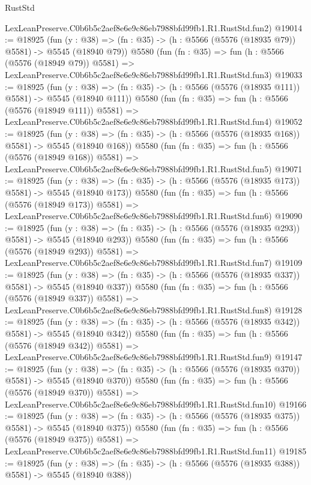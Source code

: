 \begin{lexlean}{RustStd}
\begin{coremodule}
    LexLeanPreserve.C0b6b5c2aef8e6e9c86eb7988bfd99fb1.R1.RustStd.fun2)
@19014 := @18925
    (fun (y : @38) => (fn : @35) -> (h : @5566 (@5576 (@18935 @79)) @5581) -> @5545 (@18940 @79))
    @5580
    (fun (fn : @35) =>
    fun (h : @5566 (@5576 (@18949 @79)) @5581) =>
    LexLeanPreserve.C0b6b5c2aef8e6e9c86eb7988bfd99fb1.R1.RustStd.fun3)
@19033 := @18925
    (fun (y : @38) => (fn : @35) -> (h : @5566 (@5576 (@18935 @111)) @5581) -> @5545 (@18940 @111))
    @5580
    (fun (fn : @35) =>
    fun (h : @5566 (@5576 (@18949 @111)) @5581) =>
    LexLeanPreserve.C0b6b5c2aef8e6e9c86eb7988bfd99fb1.R1.RustStd.fun4)
@19052 := @18925
    (fun (y : @38) => (fn : @35) -> (h : @5566 (@5576 (@18935 @168)) @5581) -> @5545 (@18940 @168))
    @5580
    (fun (fn : @35) =>
    fun (h : @5566 (@5576 (@18949 @168)) @5581) =>
    LexLeanPreserve.C0b6b5c2aef8e6e9c86eb7988bfd99fb1.R1.RustStd.fun5)
@19071 := @18925
    (fun (y : @38) => (fn : @35) -> (h : @5566 (@5576 (@18935 @173)) @5581) -> @5545 (@18940 @173))
    @5580
    (fun (fn : @35) =>
    fun (h : @5566 (@5576 (@18949 @173)) @5581) =>
    LexLeanPreserve.C0b6b5c2aef8e6e9c86eb7988bfd99fb1.R1.RustStd.fun6)
@19090 := @18925
    (fun (y : @38) => (fn : @35) -> (h : @5566 (@5576 (@18935 @293)) @5581) -> @5545 (@18940 @293))
    @5580
    (fun (fn : @35) =>
    fun (h : @5566 (@5576 (@18949 @293)) @5581) =>
    LexLeanPreserve.C0b6b5c2aef8e6e9c86eb7988bfd99fb1.R1.RustStd.fun7)
@19109 := @18925
    (fun (y : @38) => (fn : @35) -> (h : @5566 (@5576 (@18935 @337)) @5581) -> @5545 (@18940 @337))
    @5580
    (fun (fn : @35) =>
    fun (h : @5566 (@5576 (@18949 @337)) @5581) =>
    LexLeanPreserve.C0b6b5c2aef8e6e9c86eb7988bfd99fb1.R1.RustStd.fun8)
@19128 := @18925
    (fun (y : @38) => (fn : @35) -> (h : @5566 (@5576 (@18935 @342)) @5581) -> @5545 (@18940 @342))
    @5580
    (fun (fn : @35) =>
    fun (h : @5566 (@5576 (@18949 @342)) @5581) =>
    LexLeanPreserve.C0b6b5c2aef8e6e9c86eb7988bfd99fb1.R1.RustStd.fun9)
@19147 := @18925
    (fun (y : @38) => (fn : @35) -> (h : @5566 (@5576 (@18935 @370)) @5581) -> @5545 (@18940 @370))
    @5580
    (fun (fn : @35) =>
    fun (h : @5566 (@5576 (@18949 @370)) @5581) =>
    LexLeanPreserve.C0b6b5c2aef8e6e9c86eb7988bfd99fb1.R1.RustStd.fun10)
@19166 := @18925
    (fun (y : @38) => (fn : @35) -> (h : @5566 (@5576 (@18935 @375)) @5581) -> @5545 (@18940 @375))
    @5580
    (fun (fn : @35) =>
    fun (h : @5566 (@5576 (@18949 @375)) @5581) =>
    LexLeanPreserve.C0b6b5c2aef8e6e9c86eb7988bfd99fb1.R1.RustStd.fun11)
@19185 := @18925
    (fun (y : @38) => (fn : @35) -> (h : @5566 (@5576 (@18935 @388)) @5581) -> @5545 (@18940 @388))

\end{coremodule}
\end{lexlean}
